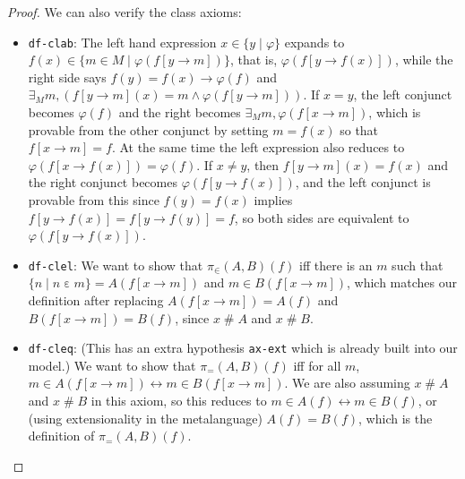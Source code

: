 \documentclass[runningheads,a4paper]{llncs}
\newcommand{\vph}{\varphi}
\newcommand{\fresh}{\mathbin{\#}}
\newcommand{\ep}{\mathbin{\varepsilon}}
\begin{document}
\begin{proof}
We can also verify the class axioms:
\begin{itemize}
  \item \texttt{df-clab}: The left hand expression $x\in\{y\mid\vph\}$ expands to $f(x)\in\{m\in M\mid\vph(f[y\to m])\}$, that is, $\vph(f[y\to f(x)])$, while the right side says $f(y)=f(x)\to\vph(f)$ and $\exists_M m,(f[y\to m](x)=m\land\vph(f[y\to m]))$. If $x=y$, the left conjunct becomes $\vph(f)$ and the right becomes $\exists_M m,\vph(f[x\to m])$, which is provable from the other conjunct by setting $m=f(x)$ so that $f[x\to m]=f$. At the same time the left expression also reduces to $\vph(f[x\to f(x)])=\vph(f)$. If $x\ne y$, then $f[y\to m](x)=f(x)$ and the right conjunct becomes $\vph(f[y\to f(x)])$, and the left conjunct is provable from this since $f(y)=f(x)$ implies $f[y\to f(x)]=f[y\to f(y)]=f$, so both sides are equivalent to $\vph(f[y\to f(x)])$.
  \item \texttt{df-clel}:
  We want to show that $\pi_\in(A,B)(f)$ iff there is an $m$ such that $\{n\mid n\ep m\}=A(f[x\to m])$ and $m\in B(f[x\to m])$, which matches our definition after replacing $A(f[x\to m])=A(f)$ and $B(f[x\to m])=B(f)$, since $x\fresh A$ and $x\fresh B$.
  \item \texttt{df-cleq}:
  (This has an extra hypothesis \texttt{ax-ext} which is already built into our model.) We want to show that $\pi_=(A,B)(f)$ iff for all $m$, $m\in A(f[x\to m])\leftrightarrow m\in B(f[x\to m])$. We are also assuming $x\fresh A$ and $x\fresh B$ in this axiom, so this reduces to $m\in A(f)\leftrightarrow m\in B(f)$, or (using extensionality in the metalanguage) $A(f)=B(f)$, which is the definition of $\pi_=(A,B)(f)$.
\end{itemize}


\end{proof}
\end{document}
